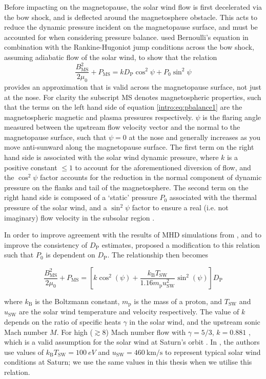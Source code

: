 Before impacting on the magnetopause, the solar wind flow is first decelerated via the bow shock, and is deflected around the magnetosphere obstacle. This acts to reduce the dynamic pressure incident on the magnetopause surface, and must be accounted for when considering pressure balance. \citet{petrinec1997} used Bernoulli's equation in combination with the Rankine-Hugoniot jump conditions across the bow shock, assuming adiabatic flow of the solar wind, to show that the relation
\begin{equation}\label{intro:eq:pbalance1}
\frac{B_{\mathrm{MS}}^2}{2\mu_0} + P_{\mathrm{MS}} = kD_\mathrm{P}\cos^2\psi + P_0\sin^2\psi
\end{equation}
provides an approximation that is valid across the magnetopause surface, not just at the nose. For clarity the subscript {\scshape{MS}} denotes magnetospheric properties, such that the terms on the left hand side of equation \ref{intro:eq:pbalance1} are the magnetospheric magnetic and plasma pressures respectively. $\psi$ is the flaring angle measured between the upstream flow velocity vector and the normal to the magnetopause surface, such that $\psi=0$ at the nose and generally increases as you move anti-sunward along the magnetopause surface. The first term on the right hand side is associated with the solar wind dynamic pressure, where $k$ is a positive constant $\leq1$ to account for the aforementioned diversion of flow, and the $\cos^2\psi$ factor accounts for the reduction in the normal component of dynamic pressure on the flanks and tail of the magnetosphere. The second term on the right hand side is composed of a `static' pressure $P_0$ associated with the thermal pressure of the solar wind, and a $\sin^2\psi$ factor to ensure a real (i.e. not imaginary) flow velocity in the subsolar region \citep[see][]{petrinec1997}.

In order to improve agreement with the results of MHD simulations from \citet{hansen2005}, and to improve the consistency of $D_\mathrm{P}$ estimates, \citet{kanani2010} proposed a modification to this relation such that $P_0$ is dependent on $D_\mathrm{P}$. The relationship then becomes

\begin{equation}\label{intro:eq:pbalance2}
\frac{B_\mathrm{MS}^2}{2\mu_0} + P_\mathrm{MS} = \left[k\cos^2(\psi) + \frac{k_\mathrm{B}T_\mathrm{SW}}{1.16m_\mathrm{p}u_\mathrm{SW}^2}\sin^2(\psi)\right] D_\mathrm{P}
\end{equation}

where $k_\mathrm{B}$ is the Boltzmann constant, $m_\mathrm{p}$ is the mass of a proton, and $T_\mathrm{SW}$ and $u_\mathrm{SW}$ are the solar wind temperature and velocity respectively. The value of $k$ depends on the ratio of specific heats $\gamma$ in the solar wind, and the upstream sonic Mach number $M$. For high (${\gtrsim}8$) Mach number flow with $\gamma = 5/3$, $k = 0.881$ \citep{spreiter1966}, which is a valid assumption for the solar wind at Saturn's orbit \cite[e.g.][]{slavin1985,achilleos2006}. In \citet{pilkington2015}, the authors use values of $k_\mathrm{B}T_\mathrm{SW}=\SI{100}{eV}$ and $u_\mathrm{SW}=\SI{460}{\km\per\second}$ to represent typical solar wind conditions at Saturn; we use the same values in this thesis when we utilise this relation.

